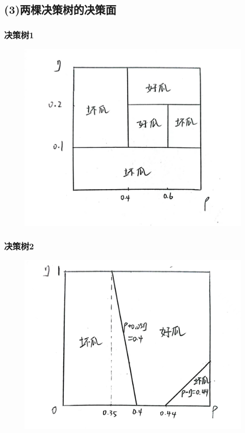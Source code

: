 \documentclass[12pt,a4paper]{article}
\begin{document}
\subsection*{(3)两棵决策树的决策面}
\subsubsection*{决策树1}
\begin{figure}[H]
    \centering
    \includegraphics*[scale = 0.15]{square01.jpg}
\end{figure}
\subsubsection*{决策树2}
\begin{figure}[H]
    \centering
    \includegraphics*[scale = 0.15]{square02.jpg}
\end{figure}
\end{document}
